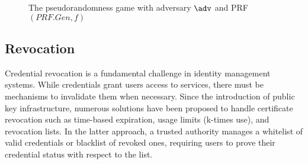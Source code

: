 \begin{figure}
\begin{pchstack}[boxed, center, space=1em]
\end{pchstack}
  \caption{The pseudorandomness game with adversary $\adv$ and PRF $(PRF.Gen, f)$}
  \label{fig:prf}
\end{figure}








\subsection{Revocation}
Credential revocation is a fundamental challenge in identity management systems. While credentials grant users access to services, there must be mechanisms to invalidate them when necessary. Since the introduction of public key infrastructure, numerous solutions have been proposed to handle certificate revocation such as time-based expiration, usage limits (k-times use), and revocation lists. In the latter approach, a trusted authority manages a whitelist of valid credentials or blacklist of revoked ones, requiring users to prove their credential status with respect to the list.

